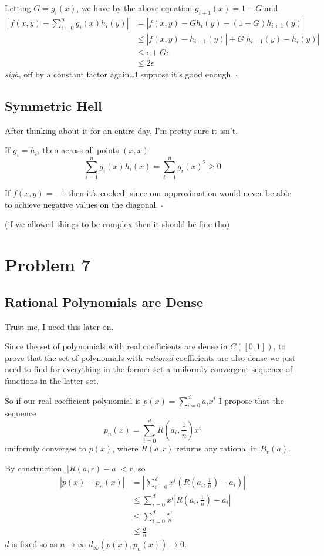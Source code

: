 \documentclass[12pt]{article}
\begin{document}
Letting $G=g_i(x)$, we have by the above equation $g_{i+1}(x)=1-G$ and
\begin{align*}
  \left|f(x, y) - \sum_{i=0}^{n} g_i(x)h_i(y)\right|
  &= |f(x, y) - Gh_i(y) - (1-G)h_{i+1}(y)| \\
  &\le |f(x, y) - h_{i+1}(y)| + G|h_{i+1}(y)-h_i(y)| \\
  &\le \epsilon + G\epsilon \\
  &\le 2\epsilon
\end{align*}
\textit{sigh}, off by a constant factor again\dots I suppose it's good enough. $\square$

\subsection{Symmetric Hell}

After thinking about it for an entire day, I'm pretty sure it isn't.

If $g_i=h_i$, then across all points $(x, x)$
\[\sum_{i=1}^{n} g_i(x)h_i(x)=\sum_{i=1}^{n} g_i(x)^2 \ge 0\]

If $f(x, y)=-1$ then it's cooked, since our approximation would never
be able to achieve negative values on the diagonal. $\square$

(if we allowed things to be complex then it should be fine tho)

\pagebreak

\section{Problem 7}

\subsection{Rational Polynomials are Dense}

Trust me, I need this later on.

Since the set of polynomials with real coefficients are dense in $C([0, 1])$,
to prove that the set of polynomials with \textit{rational} coefficients
are also dense we just need to find for everything in the former set
a uniformly convergent sequence of functions in the latter set.

So if our real-coefficient polynomial is $p(x)=\sum_{i=0}^{d} a_ix^i$
I propose that the sequence
\[p_n(x)=\sum_{i=0}^{d} R\left(a_i, \frac{1}{n}\right) x^i\]
uniformly converges to $p(x)$, where $R(a, r)$ returns any rational in $B_r(a)$.

By construction, $\left|R(a, r) - a\right| < r$, so
\begin{align*}
  |p(x)-p_n(x)|
   & = \left|\sum_{i=0}^{d} x^i\left(R\left(a_i, \frac{1}{n}\right) - a_i\right)\right| \\
   & \le \sum_{i=0}^{d} x^i \left|R\left(a_i, \frac{1}{n}\right) - a_i\right|           \\
   & \le \sum_{i=0}^{d} \frac{x^i}{n}                                                   \\
   & \le \frac{d}{n}
\end{align*}
$d$ is fixed so as $n \to \infty$ $d_\infty(p(x), p_n(x)) \to 0$.
\end{document}

